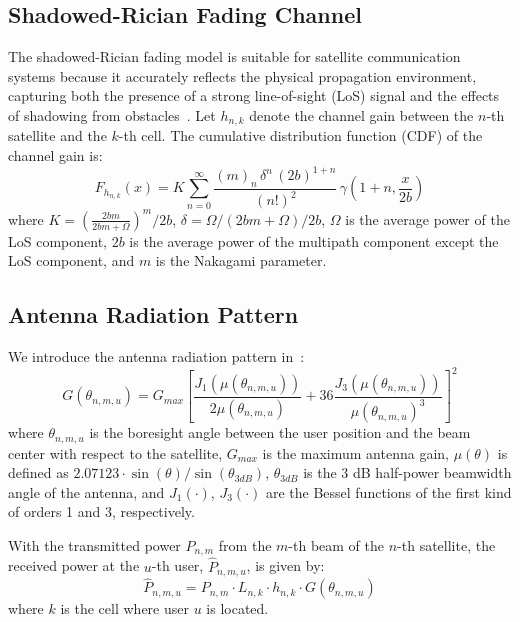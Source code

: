 \subsection{Shadowed-Rician Fading Channel}
The shadowed-Rician fading model is suitable for satellite communication systems because it accurately reflects the physical propagation environment, capturing both the presence of a strong line-of-sight (LoS) signal and the effects of shadowing from obstacles~\cite{channel-model}. Let $h_{n,k}$ denote the channel gain between the $n$-th satellite and the $k$-th cell. The cumulative distribution function (CDF) of the channel gain is:
\begin{equation}
    F_{h_{n,k}}(x) = K \sum_{n=0}^{\infty} \frac{(m)_n \, \delta^n \, (2b)^{1+n}}{(n!)^2} \, \gamma\left(1+n, \frac{x}{2b}\right)
\end{equation}
where $K = \left(\frac{2bm}{2bm+\Omega}\right)^m/2b$, $\delta = \Omega/(2bm+\Omega)/2b$, $\Omega$ is the average power of the LoS component, $2b$ is the average power of the multipath component except the LoS component, and $m$ is the Nakagami parameter.

\subsection{Antenna Radiation Pattern}
We introduce the antenna radiation pattern in~\cite{Energy-Efficient}:
\begin{equation}
    G(\theta_{n,m,u}) = G_{max} \left[ \frac{J_1\left(\mu(\theta_{n,m,u})\right)}{2\mu(\theta_{n,m,u})}
    + 36 \frac{J_3\left(\mu(\theta_{n,m,u})\right)}{\mu(\theta_{n,m,u})^3} \right]^2
\end{equation}
where $\theta_{n,m,u}$ is the boresight angle between the user position and the beam center with respect to the satellite, $G_{max}$ is the maximum antenna gain, $\mu(\theta)$ is defined as $2.07123 \cdot \sin(\theta)/\sin(\theta_{3dB})$, $\theta_{3dB}$ is the 3 dB half-power beamwidth angle of the antenna, and $J_1(\cdot)$, $J_3(\cdot)$ are the Bessel functions of the first kind of orders 1 and 3, respectively.

With the transmitted power $P_{n,m}$ from the $m$-th beam of the $n$-th satellite, the received power at the $u$-th user, $\hat{P}_{n,m,u}$, is given by:
\begin{equation}
    \hat{P}_{n,m,u} = P_{n,m} \cdot L_{n,k} \cdot h_{n,k} \cdot G(\theta_{n,m,u})
\end{equation}
where $k$ is the cell where user $u$ is located.

